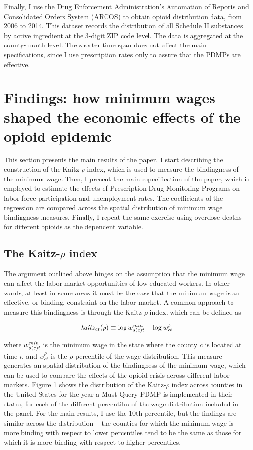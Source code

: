 \documentclass[12pt,a4paper]{article}
\begin{document}
Finally, I use the Drug Enforcement Administration's Automation of Reports and Consolidated Orders System (ARCOS) to obtain opioid distribution data, from 2006 to 2014.
This dataset records the distribution of all Schedule II substances by active ingredient at the 3-digit ZIP code level.
The data is aggregated at the county-month level.
The shorter time span does not affect the main specifications, since I use prescription rates only to assure that the PDMPs are effective.

\section*{Findings: how minimum wages shaped the economic effects of the opioid epidemic}

This section presents the main results of the paper. 
I start describing the construction of the Kaitz-\(\rho\) index, which is used to measure the bindingness of the minimum wage.
Then, I present the main especification of the paper, which is employed to estimate the effects of Prescription Drug Monitoring Programs on labor force participation and unemployment rates.
The coefficients of the regression are compared across the spatial distribution of minimum wage bindingness measures.
Finally, I repeat the same exercise using overdose deaths for different opioids as the dependent variable.

\subsection*{The Kaitz-\(\rho\) index}

The argument outlined above hinges on the assumption that the minimum wage can affect the labor market opportunities of low-educated workers.
In other words, at least in some areas it must be the case that the minimum wage is an effective, or binding, constraint on the labor market.
A common approach to measure this bindingness is through the Kaitz-\(\rho\) index, which can be defined as

\begin{equation}
    \text{\textit{kaitz}}_{ct}(\rho) \equiv \log{w^{\text{\textit{min}}}_{s(c)t}} - \log{w^{\rho}_{ct}}
\end{equation}

where \(w^{\text{\textit{min}}}_{s(c)t}\) is the minimum wage in the state where the county \(c\) is located at time \(t\), and \(w^{\rho}_{ct}\) is the \(\rho\) percentile of the wage distribution.
This measure generates an spatial distribution of the bindingness of the minimum wage, which can be used to compare the effects of the opioid crisis across different labor markets.
Figure 1 shows the distribution of the Kaitz-\(\rho\) index across counties in the United States for the year a Must Query PDMP is implemented in their states, for each of the different percentiles of the wage distribution included in the panel.
For the main results, I use the 10th percentile, but the findings are similar across the distribution -- the counties for which the minimum wage is more binding with respect to lower percentiles tend to be the same as those for which it is more binding with respect to higher percentiles.
\end{document}
